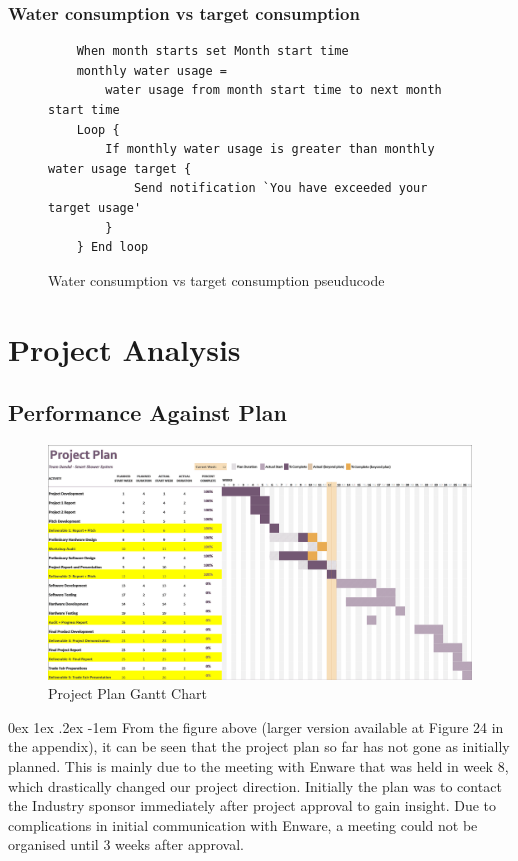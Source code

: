 \documentclass[12pt, a4paper]{article}
\makeatletter
\renewcommand\paragraph{\@startsection{paragraph}{5}{\parindent}%
  {0ex \@plus1ex \@minus.2ex}%
  {-1em}%
  {\normalfont\normalsize\bfseries}}
\makeatother
\begin{document}
            \subsubsection{Water consumption vs target consumption}
                \footnotesize
                \begin{figure}[H]
                    \begin{lstlisting}
    When month starts set Month start time
    monthly water usage = 
        water usage from month start time to next month start time
    Loop {
        If monthly water usage is greater than monthly water usage target {
            Send notification `You have exceeded your target usage'
        }
    } End loop
                    \end{lstlisting}
                    \caption{Water consumption vs target consumption pseuducode}
                \end{figure}
                \normalsize

    \newpage
    \section{Project Analysis}
        \subsection{Performance Against Plan}
            \begin{figure}[H]
                \centering
                \includegraphics[width=\linewidth]{img/Gantt_Chart_Final.png}
                \caption{Project Plan Gantt Chart}
            \end{figure}
            \paragraph{}
                From the figure above (larger version available at Figure 24 in the appendix), it can be seen that the project plan so far has not gone as initially planned. This is mainly due to the meeting 
                with Enware that was held in week 8, which drastically changed our project direction. Initially the plan was to contact the Industry sponsor 
                immediately after project approval to gain insight. Due to complications in initial communication with Enware, a meeting could not be organised 
                until 3 weeks after approval.
\end{document}
